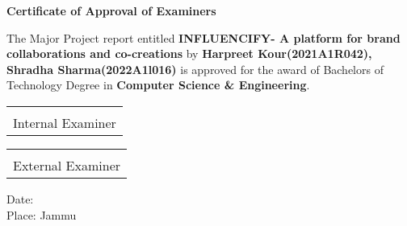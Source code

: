 \newpage
    \begin{center}
    
        \vspace*{0.1cm}
        \large
       

        
        \vspace{0.8cm}
        
        \large
        \textbf{Certificate of Approval of Examiners}\\
        \vspace{0.5cm}
        
    \end{center}

    

{\large The Major Project report entitled  \textbf{INFLUENCIFY- A platform for brand collaborations and co-creations}  by \textbf{Harpreet Kour(2021A1R042), Shradha Sharma(2022A1l016)} is approved for the award of Bachelors of Technology Degree in \textbf{Computer Science \& Engineering}.} 

\vspace{2cm}

    

\begin{table}[h]
\begin{flushright}
\begin{tabular}{Y}
\hrulefill\\
\large Internal Examiner\\
\end{tabular}
\end{flushright}
\end{table}

\vspace{1cm}
\hfill
\begin{table}[h]
\begin{flushright}
\begin{tabular}{Y}
\hrulefill\\
\large External Examiner
\end{tabular}
\end{flushright}
\end{table}

\vspace{1cm}
\noindent


\begin{flushleft}
{\large Date:}\\
{\large Place: Jammu}
\end{flushleft}